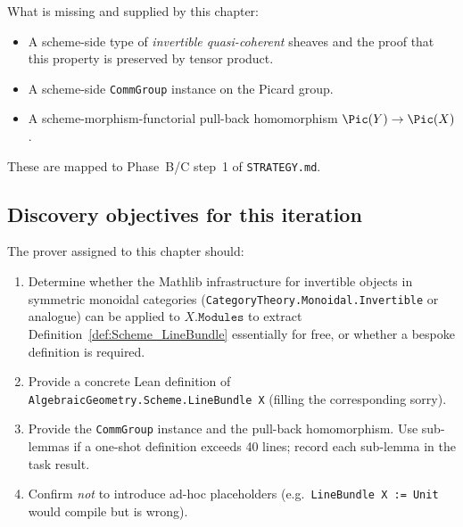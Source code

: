 What is missing and supplied by this chapter:
\begin{itemize}
  \item A scheme-side type of \emph{invertible quasi-coherent} sheaves and the proof that this property is preserved by tensor product.
  \item A scheme-side \lstinline{CommGroup} instance on the Picard group.
  \item A scheme-morphism-functorial pull-back homomorphism $\Pic(Y) \to \Pic(X)$.
\end{itemize}

These are mapped to Phase~B/C step~1 of \texttt{STRATEGY.md}.

\subsection{Discovery objectives for this iteration}

The prover assigned to this chapter should:
\begin{enumerate}
  \item Determine whether the Mathlib infrastructure for invertible objects in symmetric monoidal categories (\lstinline{CategoryTheory.Monoidal.Invertible} or analogue) can be applied to $X.\mathtt{Modules}$ to extract Definition~\ref{def:Scheme_LineBundle} essentially for free, or whether a bespoke definition is required.
  \item Provide a concrete Lean definition of \lstinline{AlgebraicGeometry.Scheme.LineBundle X} (filling the corresponding sorry).
  \item Provide the \lstinline{CommGroup} instance and the pull-back homomorphism. Use sub-lemmas if a one-shot definition exceeds 40 lines; record each sub-lemma in the task result.
  \item Confirm \emph{not} to introduce ad-hoc placeholders (e.g.\ \lstinline{LineBundle X := Unit} would compile but is wrong).
\end{enumerate}
